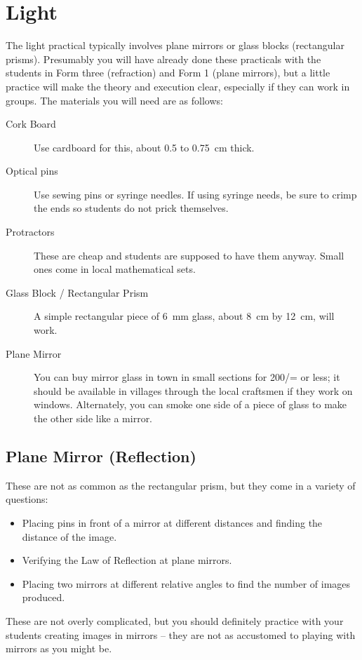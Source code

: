 \section{Light}
The light practical typically involves plane mirrors or glass blocks (rectangular
prisms). Presumably you will have already done these practicals with the students in Form
three (refraction) and Form 1 (plane mirrors), but a little practice will make the theory and
execution clear, especially if they can work in groups. The materials you will need are as
follows:
\begin{description}
\item[Cork Board]{Use cardboard for this, about 0.5 to 0.75~cm thick.}
\item[Optical pins]{Use sewing pins or syringe needles. If using syringe needs, be
sure to crimp the ends so students do not prick themselves.}
\item[Protractors]{These are cheap and students are supposed to have them anyway.
Small ones come in local mathematical sets.}
\item[Glass Block / Rectangular Prism]{A simple rectangular piece of 6~mm glass,
about 8~cm by 12~cm, will work.}
\item[Plane Mirror]{You can buy mirror glass in town in small sections for 200/= or
less; it should be available in villages through the local craftsmen if they work on
windows. Alternately, you can smoke one side of a piece of glass to make the
other side like a mirror.}
\end{description}

\subsection{Plane Mirror (Reflection)}  

These are not as common as the rectangular prism, but they come in a variety of
questions:
\begin{itemize}
\item{Placing pins in front of a mirror at different distances and finding the distance of
the image.}
\item{Verifying the Law of Reflection at plane mirrors.}
\item{Placing two mirrors at different relative angles to find the number of images
produced.}
\end{itemize}
These are not overly complicated, but you should definitely practice with your students creating images in
mirrors -- they are not as accustomed to playing with mirrors as you might be.

